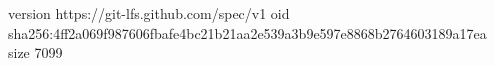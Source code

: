 version https://git-lfs.github.com/spec/v1
oid sha256:4ff2a069f987606fbafe4bc21b21aa2e539a3b9e597e8868b2764603189a17ea
size 7099
